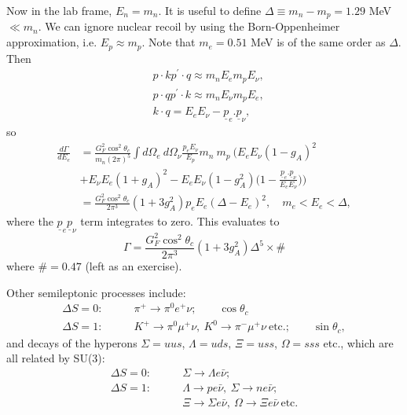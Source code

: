 \documentclass[a4paper,12pt]{article}
\begin{document}
Now in the lab frame, $E_n = m_n$. It is useful to define $\Delta \equiv m_n - m_p = 1.29$ MeV $\ll m_n$. We can ignore nuclear recoil by using the Born-Oppenheimer approximation, i.e. $E_p \approx m_p$. Note that $m_e=0.51$ MeV is of the same order as $\Delta$. Then 
\begin{equation}
\begin{split}
&p \cdot k p^\prime \cdot q \approx m_nE_e m_p E_\nu, \\
&p \cdot q p^\prime \cdot k \approx m_nE_\nu m_pE_e, \\
& k \cdot q = E_e E_\nu - \underline{p}_e . \underline{p}_\nu,
\end{split}
\end{equation}
so
\begin{equation}
\begin{split}
\frac{d\Gamma}{dE_e} &= \frac{G_F^2 \cos^2\theta_c}{m_n(2\pi)^5} \int d\Omega_e \ d\Omega_\nu \frac{p_e E_\nu}{E_p} m_n\ m_p\ \bigg(E_eE_\nu(1-g_A)^2 \\ &+ E_\nu E_e(1+g_A)^2 - E_e E_\nu(1-g_A^2)\bigg(1-\frac{\underline{p}_e.\underline{p}_\nu}{E_e E_\nu}\bigg)\bigg) \\
&= \frac{G_F^2\cos^2\theta_c}{2\pi^3}(1+3g_A^2)p_eE_e(\Delta-E_e)^2, \quad m_e < E_e < \Delta,
\end{split}
\end{equation}
where the $\underline{p}_e\underline{p}_\nu$ term integrates to zero. This evaluates to
\begin{equation}
\Gamma = \frac{G_F^2\cos^2\theta_c}{2\pi^3}(1+3 g_A^2) \Delta^5 \times \#
\end{equation}
where $\# = 0.47$ (left as an exercise).

Other semileptonic processes include:
\begin{equation}
\begin{split}
\Delta S = 0: \qquad &\pi^+ \to \pi^0e^+\nu; \qquad \cos\theta_c \\
\Delta S = 1: \qquad &K^+ \to \pi^0\mu^+\nu,\ K^0 \to \pi^-\mu^+\nu\ \text{etc.}; \qquad \sin\theta_c,
\end{split}
\end{equation}
and decays of the hyperons $\Sigma = uus$, $\Lambda = uds$, $\Xi = uss$, $\Omega = sss$ etc., which are all related by SU(3):
\begin{equation}
\begin{split}
\Delta S = 0: \qquad &\Sigma \to \Lambda e \bar{\nu}; \\
\Delta S = 1: \qquad &\Lambda \to pe\bar{\nu},\ \Sigma \to ne\bar{\nu}; \\
&\Xi \to \Sigma e \bar{\nu},\ \Omega \to \Xi e \bar{\nu}\ \text{etc.} 
\end{split}
\end{equation}
\end{document}
